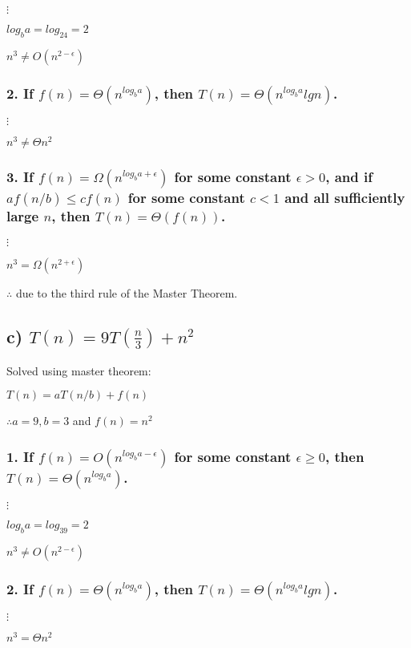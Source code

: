 \documentclass{article}
\begin{document}
$\vdots$

$log_ba = log_24 = 2$

$n^3 \neq O(n^{2 - \epsilon})$

\subsubsection*{2. If $f(n) = \Theta(n^{log_ba})$, then $T(n) = \Theta(n^{log_ba}lgn)$.}

$\vdots$

$n^3 \neq \Theta n^2$

\subsubsection*{3. If $f(n) = \Omega(n^{log_ba + \epsilon})$ for some constant $\epsilon > 0$, and if $af(n/b) \leq cf(n)$ for some constant $c < 1$ and all sufficiently large $n$, then $T(n) = \Theta(f(n))$.}

$\vdots$

$n^3 = \Omega(n^{2 + \epsilon})$

$\therefore$  due to the third rule of the Master Theorem.

\subsection*{c) $T(n) = 9T(\frac{n}{3}) + n^2$}

Solved using master theorem:

$T(n) = aT(n/b) + f(n)$

$\therefore a = 9, b = 3$ and $f(n) = n^2$

\subsubsection*{1. If $f(n) = O(n^{log_ba - \epsilon})$ for some constant $\epsilon \geq  0$, then $T(n) = \Theta(n^{log_ba})$.}

$\vdots$

$log_ba = log_39 = 2$

$n^3 \neq O(n^{2 - \epsilon})$

\subsubsection*{2. If $f(n) = \Theta(n^{log_ba})$, then $T(n) = \Theta(n^{log_ba}lgn)$.}

$\vdots$

$n^3 = \Theta n^2$
\end{document}
